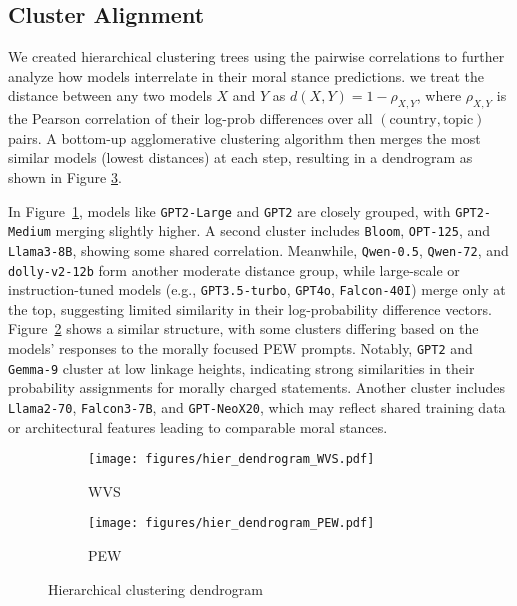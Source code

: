 \documentclass[11pt]{article}
\begin{document}
\vspace{-12pt}



\subsection{Cluster Alignment}
We created hierarchical clustering trees using the pairwise correlations to further analyze how models interrelate in their moral stance predictions.  we treat the distance between any two models \(X\) and \(Y\) as \(d(X,Y) = 1 - \rho_{X,Y}\), where \(\rho_{X,Y}\) is the Pearson correlation of their log-prob differences over all \((\text{country}, \text{topic})\) pairs. A bottom-up agglomerative clustering algorithm then merges the most similar models (lowest distances) at each step, resulting in a dendrogram as shown in Figure \ref{fig:hier}.

In Figure~\ref{fig:hier_wvs_new}, models like \texttt{GPT2-Large} and \texttt{GPT2} are closely grouped, with \texttt{GPT2-Medium} merging slightly higher. A second cluster includes \texttt{Bloom}, \texttt{OPT-125}, and \texttt{Llama3-8B}, showing some shared correlation. Meanwhile, \texttt{Qwen-0.5}, \texttt{Qwen-72}, and \texttt{dolly-v2-12b} form another moderate distance group, while large-scale or instruction-tuned models (e.g., \texttt{GPT3.5-turbo}, \texttt{GPT4o}, \texttt{Falcon-40I}) merge only at the top, suggesting limited similarity in their log-probability difference vectors. Figure~\ref{fig:hier_pew_new} shows a similar structure, with some clusters differing based on the models' responses to the morally focused PEW prompts. Notably, \texttt{GPT2} and \texttt{Gemma-9} cluster at low linkage heights, indicating strong similarities in their probability assignments for morally charged statements. Another cluster includes \texttt{Llama2-70}, \texttt{Falcon3-7B}, and \texttt{GPT-NeoX20}, which may reflect shared training data or architectural features leading to comparable moral stances.

\begin{figure}[H]
    \centering
    \begin{subfigure}{0.4\textwidth}
        \centering
        \texttt{[image: figures/hier\_dendrogram\_WVS.pdf]}
        \caption{WVS}
        \label{fig:hier_wvs_new}
    \end{subfigure}%
    \hspace{-5pt}
    \begin{subfigure}{0.4\textwidth}
        \centering
        \texttt{[image: figures/hier\_dendrogram\_PEW.pdf]}
        \caption{PEW}
        \label{fig:hier_pew_new}
    \end{subfigure}
    \vspace{-8pt}
    \caption{\small Hierarchical clustering dendrogram}
    \label{fig:hier}
\end{figure}
\vspace{-5pt}
\end{document}
